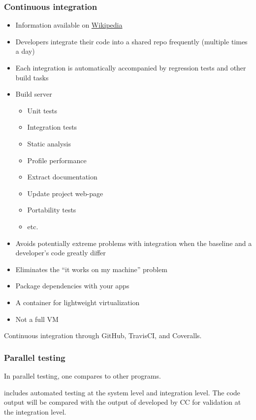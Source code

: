 \documentclass[12pt, titlepage]{article}
\begin{document}
\subsubsection{Continuous integration}
\begin{itemize}
\item Information available on
  \href{https://en.wikipedia.org/wiki/Continuous_integration}{Wikipedia}
\item Developers integrate their code into a shared repo frequently (multiple
  times a day)
\item Each integration is automatically accompanied by regression tests and
  other build tasks
\item Build server
\begin{itemize}
\item Unit tests
\item Integration tests
\item Static analysis
\item Profile performance
\item Extract documentation
\item Update project web-page
\item Portability tests
\item etc.
\end{itemize}
\item Avoids potentially extreme problems with integration when the baseline and
  a developer's code greatly differ
\end{itemize}

\begin{itemize}
\item Eliminates the ``it works on my machine'' problem
\item Package dependencies with your apps
\item A container for lightweight virtualization
\item Not a full VM
\end{itemize}

Continuous integration through GitHub, TravisCI, and Coveralls.

\subsubsection{Parallel testing}
In parallel testing, one compares to other programs.

 includes automated testing at the system level
and integration level. The code output
will be compared with the output of \rdcon developed by CC for validation at the integration level.
\end{document}
